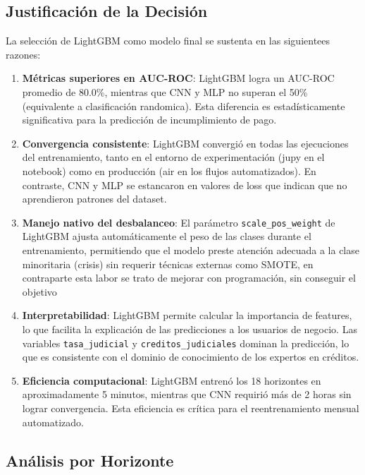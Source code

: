 \subsection{Justificación de la Decisión}

La selección de LightGBM como modelo final se sustenta en las siguientees razones:

\begin{enumerate}

    \item\textbf{Métricas superiores en AUC-ROC}: LightGBM logra un AUC-ROC promedio de 80.0\%, mientras que CNN y MLP no superan el 50\% (equivalente a clasificación randomica). Esta diferencia es estadísticamente significativa para la predicción de incumplimiento de pago.

    \item\textbf{Convergencia consistente}: LightGBM convergió en todas las ejecuciones del entrenamiento, tanto en el entorno de experimentación (jupy en el notebook) como en producción (air en los flujos automatizados). En contraste, CNN y MLP se estancaron en valores de loss que indican que no aprendieron patrones del dataset.

    \item\textbf{Manejo nativo del desbalanceo}: El parámetro \texttt{scale\_pos\_weight} de LightGBM ajusta automáticamente el peso de las clases durante el entrenamiento, permitiendo que el modelo preste atención adecuada a la clase minoritaria (crisis) sin requerir técnicas externas como SMOTE, en contraparte esta labor se trato de mejorar con programación, sin conseguir el objetivo

    \item\textbf{Interpretabilidad}: LightGBM permite calcular la importancia de features, lo que facilita la explicación de las predicciones a los usuarios de negocio. Las variables \texttt{tasa\_judicial} y \texttt{creditos\_judiciales} dominan la predicción, lo que es consistente con el dominio de conocimiento de los expertos en créditos.

    \item\textbf{Eficiencia computacional}: LightGBM entrenó los 18 horizontes en aproximadamente 5 minutos, mientras que CNN requirió más de 2 horas sin lograr convergencia. Esta eficiencia es crítica para el reentrenamiento mensual automatizado.
\end{enumerate}

\subsection{Análisis por Horizonte}

